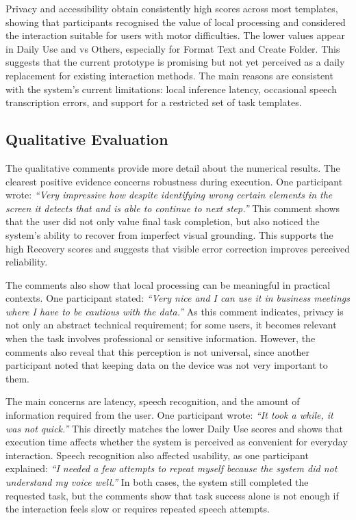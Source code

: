 Privacy and accessibility obtain consistently high scores across most templates, showing that participants recognised the value of local processing and considered the interaction suitable for users with motor difficulties. The lower values appear in Daily Use and vs Others, especially for Format Text and Create Folder. This suggests that the current prototype is promising but not yet perceived as a daily replacement for existing interaction methods. The main reasons are consistent with the system's current limitations: local inference latency, occasional speech transcription errors, and support for a restricted set of task templates.

\subsection{Qualitative Evaluation}

The qualitative comments provide more detail about the numerical results. The clearest positive evidence concerns robustness during execution. One participant wrote: \textit{``Very impressive how despite identifying wrong certain elements in the screen it detects that and is able to continue to next step.''} This comment shows that the user did not only value final task completion, but also noticed the system's ability to recover from imperfect visual grounding. This supports the high Recovery scores and suggests that visible error correction improves perceived reliability.

The comments also show that local processing can be meaningful in practical contexts. One participant stated: \textit{``Very nice and I can use it in business meetings where I have to be cautious with the data.''} As this comment indicates, privacy is not only an abstract technical requirement; for some users, it becomes relevant when the task involves professional or sensitive information. However, the comments also reveal that this perception is not universal, since another participant noted that keeping data on the device was not very important to them.

The main concerns are latency, speech recognition, and the amount of information required from the user. One participant wrote: \textit{``It took a while, it was not quick.''} This directly matches the lower Daily Use scores and shows that execution time affects whether the system is perceived as convenient for everyday interaction. Speech recognition also affected usability, as one participant explained: \textit{``I needed a few attempts to repeat myself because the system did not understand my voice well.''} In both cases, the system still completed the requested task, but the comments show that task success alone is not enough if the interaction feels slow or requires repeated speech attempts.

